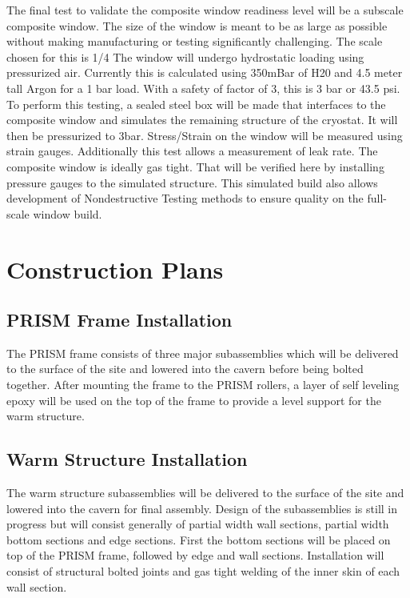 The final test to validate the composite window readiness level will be a subscale composite window.
The size of the window is meant to be as large as possible without making manufacturing or testing
significantly challenging. The scale chosen for this is 1/4
The window will undergo hydrostatic loading using pressurized air. Currently this is calculated using
350mBar of H20 and 4.5 meter tall Argon for a 1 bar load. With a safety of factor of 3, this is 3 bar or
43.5 psi. To perform this testing, a sealed steel box will be made that interfaces to the composite
window and simulates the remaining structure of the cryostat. It will then be pressurized to 3bar.
Stress/Strain on the window will be measured using strain gauges.
Additionally this test allows a measurement of leak rate. The composite window is ideally gas tight.
That will be verified here by installing pressure gauges to the simulated structure.
This simulated build also allows development of Nondestructive Testing methods to ensure quality
on the full-scale window build.

\section{Construction Plans}
\label{sec:cryost-construc}

\subsection{PRISM Frame Installation}
\label{sec:cryost-construc-PRISMFrame}

The PRISM frame consists of three major subassemblies which will be delivered to the surface of the site and lowered into the cavern before being bolted together. After mounting the frame to the PRISM rollers, a layer of self leveling epoxy will be used on the top of the frame to provide a level support for the warm structure.

\subsection{Warm Structure Installation}
\label{sec:cryost-construc-warm}

The warm structure subassemblies will be delivered to the surface of the site and lowered into the cavern for final assembly. Design of the subassemblies is still in progress but will consist generally of partial width wall sections, partial width bottom sections and edge sections. First the bottom sections will be placed on top of the PRISM frame, followed by edge and wall sections. Installation will consist of structural bolted joints and gas tight welding of the inner skin of each wall section.

